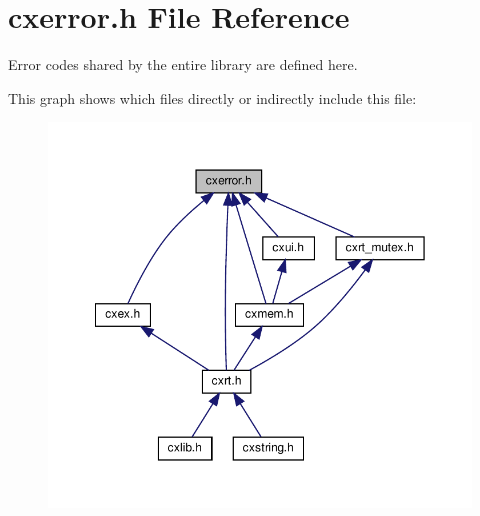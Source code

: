 \hypertarget{a00008}{}\section{cxerror.\+h File Reference}
\label{a00008}


Error codes shared by the entire library are defined here.  


This graph shows which files directly or indirectly include this file\+:
\nopagebreak
\begin{figure}[H]
\begin{center}
\leavevmode
\includegraphics[width=350pt]{a00010}
\end{center}
\end{figure}
